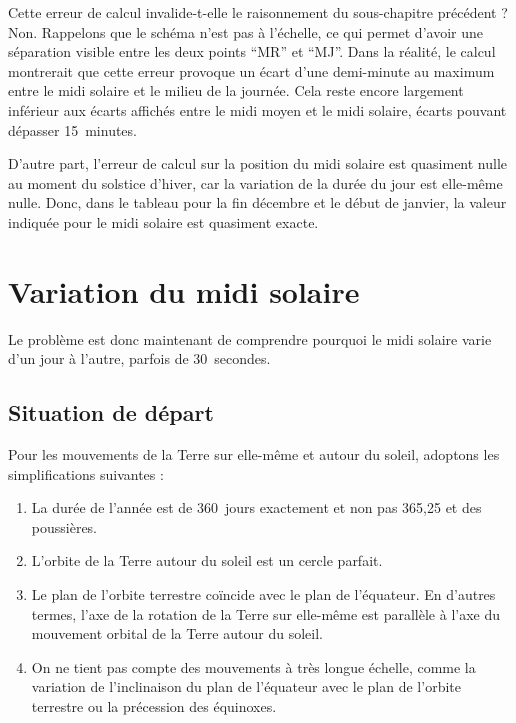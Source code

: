 \documentclass[a4paper]{article}
\newenvironment{texte}{\rmfamily}{}
\begin{document}
\begin{texte}
Cette erreur de calcul invalide-t-elle le raisonnement du
sous-chapitre précédent ? Non. Rappelons que le schéma n'est pas à l'échelle,
ce qui permet d'avoir une séparation visible entre les deux points
``MR'' et ``MJ''. Dans la réalité, le calcul montrerait que cette erreur
provoque un écart d'une demi-minute au maximum entre le midi solaire
et le milieu de la journée. Cela reste encore largement inférieur aux
écarts affichés entre le midi moyen et le midi solaire, écarts pouvant
dépasser 15~minutes.

D'autre part, l'erreur de calcul sur la position du midi
solaire est quasiment nulle au moment du solstice d'hiver,
car la variation de la durée du jour est elle-même nulle.
Donc, dans le tableau pour la fin décembre et le début 
de janvier, la valeur indiquée pour le midi solaire
est quasiment exacte.

\section{Variation du midi solaire}

Le problème est donc maintenant de comprendre pourquoi
le midi solaire varie d'un jour à l'autre, parfois
de 30~secondes.

\subsection{Situation de départ}

Pour les mouvements de la Terre sur elle-même et autour
du soleil, adoptons les simplifications suivantes :

\begin{enumerate}

\item La durée de l'année est de 360~jours exactement et
non pas 365,25 et des poussières.

\item L'orbite de la Terre autour du soleil est un cercle parfait.

\item Le plan de l'orbite terrestre coïncide avec le plan de l'équateur.
En d'autres termes, l'axe de la rotation de la Terre sur elle-même est
parallèle à l'axe du mouvement orbital de la Terre autour du soleil.

\item On ne tient pas compte des mouvements à très longue échelle, comme
la variation de l'inclinaison du plan de l'équateur avec le plan de l'orbite
terrestre ou la précession des équinoxes.


\end{enumerate}
\end{texte}
\end{document}
